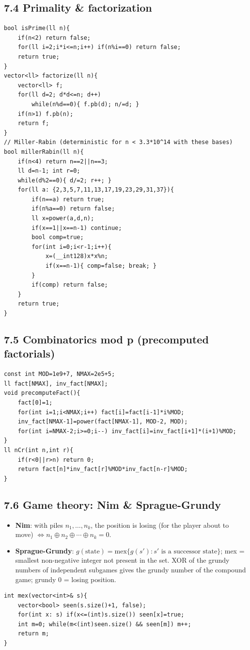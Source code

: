 \documentclass[11pt]{extarticle}
\begin{document}
\subsection*{7.4 Primality \& factorization}
\begin{lstlisting}
bool isPrime(ll n){
    if(n<2) return false;
    for(ll i=2;i*i<=n;i++) if(n%i==0) return false;
    return true;
}
vector<ll> factorize(ll n){
    vector<ll> f;
    for(ll d=2; d*d<=n; d++)
        while(n%d==0){ f.pb(d); n/=d; }
    if(n>1) f.pb(n);
    return f;
}
// Miller-Rabin (deterministic for n < 3.3*10^14 with these bases)
bool millerRabin(ll n){
    if(n<4) return n==2||n==3;
    ll d=n-1; int r=0;
    while(d%2==0){ d/=2; r++; }
    for(ll a: {2,3,5,7,11,13,17,19,23,29,31,37}){
        if(n==a) return true;
        if(n%a==0) return false;
        ll x=power(a,d,n);
        if(x==1||x==n-1) continue;
        bool comp=true;
        for(int i=0;i<r-1;i++){
            x=(__int128)x*x%n;
            if(x==n-1){ comp=false; break; }
        }
        if(comp) return false;
    }
    return true;
}
\end{lstlisting}

\subsection*{7.5 Combinatorics mod p (precomputed factorials)}
\begin{lstlisting}
const int MOD=1e9+7, NMAX=2e5+5;
ll fact[NMAX], inv_fact[NMAX];
void precomputeFact(){
    fact[0]=1;
    for(int i=1;i<NMAX;i++) fact[i]=fact[i-1]*i%MOD;
    inv_fact[NMAX-1]=power(fact[NMAX-1], MOD-2, MOD);
    for(int i=NMAX-2;i>=0;i--) inv_fact[i]=inv_fact[i+1]*(i+1)%MOD;
}
ll nCr(int n,int r){
    if(r<0||r>n) return 0;
    return fact[n]*inv_fact[r]%MOD*inv_fact[n-r]%MOD;
}
\end{lstlisting}

\subsection*{7.6 Game theory: Nim \& Sprague-Grundy}
\begin{itemize}[leftmargin=1.1em,itemsep=0pt,topsep=1pt]
\item \textbf{Nim}: with piles $n_1,\dots,n_k$, the position is losing (for the player about to move) $\iff n_1 \oplus n_2 \oplus \cdots \oplus n_k = 0$.
\item \textbf{Sprague-Grundy}: $g(\text{state}) = \text{mex}\{g(s') : s' \text{ is a successor state}\}$; mex = smallest non-negative integer not present in the set. XOR of the grundy numbers of independent subgames gives the grundy number of the compound game; grundy 0 = losing position.
\end{itemize}
\begin{lstlisting}
int mex(vector<int>& s){
    vector<bool> seen(s.size()+1, false);
    for(int x: s) if(x<=(int)s.size()) seen[x]=true;
    int m=0; while(m<(int)seen.size() && seen[m]) m++;
    return m;
}
\end{lstlisting}
\end{document}
